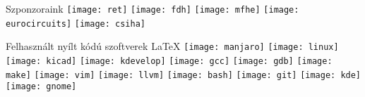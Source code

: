 \begin{frame}{Szponzoraink}
\texttt{[image: ret]}
\texttt{[image: fdh]}
\texttt{[image: mfhe]}
\texttt{[image: eurocircuits]}
\texttt{[image: csiha]}
\end{frame}

\begin{frame}{Felhasznált nyílt kódú szoftverek}
	\LaTeX
	\texttt{[image: manjaro]}
	\texttt{[image: linux]}
	\texttt{[image: kicad]}
	\texttt{[image: kdevelop]}
	\texttt{[image: gcc]}
	\texttt{[image: gdb]}
	\texttt{[image: make]}
	\texttt{[image: vim]}
	\texttt{[image: llvm]}
	\texttt{[image: bash]}
	\texttt{[image: git]}
	\texttt{[image: kde]}
	\texttt{[image: gnome]}
\end{frame}
